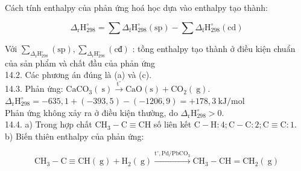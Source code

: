 \documentclass[10pt]{article}
\begin{document}
Cách tính enthalpy của phản ứng hoá học dựa vào enthalpy tạo thành:

$$
\Delta_{\mathrm{r}} \mathrm{H}_{298}^{\circ}=\sum \Delta_{\mathrm{f}} \mathrm{H}_{298}^{\circ}(\mathrm{sp})-\sum \Delta_{\mathrm{f}} \mathrm{H}_{298}^{\circ}(\mathrm{cd})
$$

Với $\sum_{\Delta_{\mathrm{r}} \mathrm{H}_{298}^{\circ}}(\mathrm{sp}), \sum_{\Delta_{\mathrm{r}} \mathrm{H}_{298}^{\circ}}(\mathrm{cđ})$ : tồng enthalpy tạo thành ở điều kiện chuẩn của sản phẩm và chất đầu của phản ứng\\
14.2. Các phương án đúng là (a) và (c).\\
14.3. Phản ứng: $\mathrm{CaCO}_{3}(\mathrm{~s}) \xrightarrow{\mathrm{t}^{\circ}} \mathrm{CaO}(\mathrm{s})+\mathrm{CO}_{2}(\mathrm{~g})$.\\
$\Delta_{\mathrm{r}} \mathrm{H}_{298}^{\circ}=-635,1+(-393,5)-(-1206,9)=+178,3 \mathrm{~kJ} / \mathrm{mol}$\\
Phản ứng không xảy ra ở điều kiện thường, do $\Delta_{\mathrm{r}} \mathrm{H}_{298}^{\circ}>0$.\\
14.4. a) Trong hợp chất $\mathrm{CH}_{3}-\mathrm{C} \equiv \mathrm{CH}$ số liên kết $\mathrm{C}-\mathrm{H}: 4 ; \mathrm{C}-\mathrm{C}: 2 ; \mathrm{C} \equiv \mathrm{C}: 1$.\\
b) Biến thiên enthalpy của phản ứng:

$$
\mathrm{CH}_{3}-\mathrm{C} \equiv \mathrm{CH}(\mathrm{~g})+\mathrm{H}_{2}(\mathrm{~g}) \xrightarrow{\mathrm{t}^{\circ}, \mathrm{Pd} / \mathrm{PbCO}_{3}} \mathrm{CH}_{3}-\mathrm{CH}=\mathrm{CH}_{2}(\mathrm{~g})
$$
\end{document}
